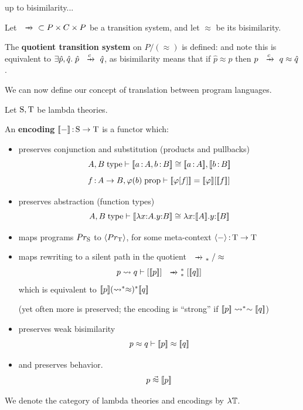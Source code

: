 \documentclass{article}
\begin{document}
up to bisimilarity...

\begin{definition}
    Let $\xr{}\; \subset P\times C\times P$ be a transition system, and let $\approx$ be its bisimilarity. 
    
    The \textbf{quotient transition system} on $P/(\approx)$ is defined:
    and note this is equivalent to $\exists \hat{p}, \hat{q}.\; \hat{p}\xr{c}\hat{q}$, as bisimilarity means that if $\hat{p}\approx p$ then $p\xr{c} q\approx \hat{q}$.
\end{definition}

We can now define our concept of translation between program languages.

\begin{definition}
    Let $\mathrm{S},\mathrm{T}$ be lambda theories. 
    
    An \textbf{encoding} $[\![-]\!]\,{:}\, \mathrm{S}\to \mathrm{T}$ is a functor which: 
    \begin{itemize}
        \item preserves conjunction and substitution (products and pullbacks) \[A,B\; \mathrm{type}\vdash [\![a\,{:}\, A, b\,{:}\, B]\!]\cong [\![a\,{:}\, A]\!], [\![b\,{:}\, B]\!]\]
        \[f\,{:}\, A\to B,\varphi(b)\; \mathrm{prop} \vdash [\![\varphi[f]]\!] = [\![\varphi]\!][[\![f]\!]]\]
        \item preserves abstraction (function types)
        \[A,B\; \mathrm{type}\vdash [\![\lambda {x{:}A}.{y{:}B}]\!]\cong \lambda x{:}[\![A]\!].y{:}[\![B]\!] \]
        \item maps programs $Pr_{\mathrm{S}}$ to $\langle Pr_{\mathrm{T}}\rangle$, for some meta-context $\langle -\rangle\,{:}\, \mathrm{T}\to \mathrm{T}$
        \item maps rewriting to a silent path in the quotient $\xr{}_\ast/\approx$
        \[p\rsq q\vdash [\map{p}]\xr{}_\ast^\ast [\map{q}]\]
        which is equivalent to $[\![p]\!] (\rightsquigarrow^\ast \approx)^\ast [\![q]\!]$

        (yet often more is preserved; the encoding is ``strong'' if $[\![p]\!]\rightsquigarrow^\ast\sim [\![q]\!]$)
        \item preserves weak bisimilarity
        \[p\approx q\vdash [\![p]\!]\approx [\![q]\!]\]
        \item and preserves behavior.
        \[p\;\vec{\approx}\; [\![p]\!]\]
    \end{itemize}
    We denote the category of lambda theories and encodings by $\lambda\mathbb{T}$.
\end{definition}
\end{document}
